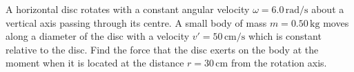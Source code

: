 \item A horizontal disc rotates with a constant angular velocity \(\omega = 6.0 \, \text{rad/s}\) about a vertical axis passing through its centre. A small body of mass \(m = 0.50 \, \text{kg}\) moves along a diameter of the disc with a velocity \(v' = 50 \, \text{cm/s}\) which is constant relative to the disc. Find the force that the disc exerts on the body at the moment when it is located at the distance \(r = 30 \, \text{cm}\) from the rotation axis.
    \begin{center}
    \end{center}